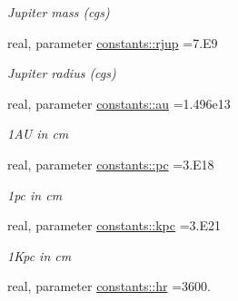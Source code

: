 \begin{DoxyCompactItemize}
\begin{DoxyCompactList}\small\item\em Jupiter mass (cgs) \end{DoxyCompactList}\item 
\hypertarget{namespaceconstants_a4cbd85fb12d8faa8be8463982fa6fd29}{}real, parameter \hyperlink{namespaceconstants_a4cbd85fb12d8faa8be8463982fa6fd29}{constants\+::rjup} =7.\+E9\label{namespaceconstants_a4cbd85fb12d8faa8be8463982fa6fd29}

\begin{DoxyCompactList}\small\item\em Jupiter radius (cgs) \end{DoxyCompactList}\item 
\hypertarget{namespaceconstants_aba9a695c84a59f13c2d528a170a43b65}{}real, parameter \hyperlink{namespaceconstants_aba9a695c84a59f13c2d528a170a43b65}{constants\+::au} =1.\+496e13\label{namespaceconstants_aba9a695c84a59f13c2d528a170a43b65}

\begin{DoxyCompactList}\small\item\em 1\+A\+U in cm \end{DoxyCompactList}\item 
\hypertarget{namespaceconstants_aa5d9aea15e53a1abbc29e5f419b38601}{}real, parameter \hyperlink{namespaceconstants_aa5d9aea15e53a1abbc29e5f419b38601}{constants\+::pc} =3.\+E18\label{namespaceconstants_aa5d9aea15e53a1abbc29e5f419b38601}

\begin{DoxyCompactList}\small\item\em 1pc in cm \end{DoxyCompactList}\item 
\hypertarget{namespaceconstants_aee24dfdb51a8ed33a59bb80e98938718}{}real, parameter \hyperlink{namespaceconstants_aee24dfdb51a8ed33a59bb80e98938718}{constants\+::kpc} =3.\+E21\label{namespaceconstants_aee24dfdb51a8ed33a59bb80e98938718}

\begin{DoxyCompactList}\small\item\em 1\+Kpc in cm \end{DoxyCompactList}\item 
\hypertarget{namespaceconstants_a1c0cbdbdc4f321db2055f6cd61cdd3f4}{}real, parameter \hyperlink{namespaceconstants_a1c0cbdbdc4f321db2055f6cd61cdd3f4}{constants\+::hr} =3600.\label{namespaceconstants_a1c0cbdbdc4f321db2055f6cd61cdd3f4}


\end{DoxyCompactItemize}
